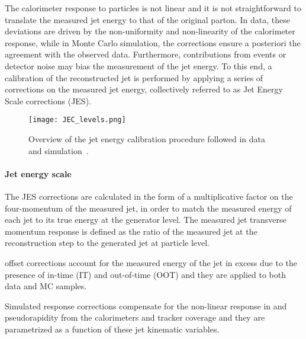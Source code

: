 The calorimeter response to particles is not linear and it is not straightforward to translate the measured jet energy
to that of the original parton.
In data, these deviations are driven by the non-uniformity and non-linearity of the calorimeter response,
while in Monte Carlo simulation, the corrections ensure a posteriori the agreement with the observed data.
Furthermore, contributions from \pileup{} events or detector noise may bias the measurement of the jet energy.
To this end, a calibration of the reconstructed jet is performed by applying a series of corrections on the measured jet energy,
collectively referred to as Jet Energy Scale corrections (JES).

\begin{figure}
\centering
\texttt{[image: JEC\_levels.png]}
\caption{Overview of the jet energy calibration procedure followed in data and simulation~\cite{CMS-JME-13-004}.}
\label{fig:JECoverview}
\end{figure}


\paragraph{Jet energy scale\\}
The JES corrections are calculated in the form of a multiplicative factor on the four-momentum of the measured jet,
in order to match the measured energy of each jet to its true energy at the generator level.
The measured jet transverse momentum response is defined as the ratio of the measured jet \pt at the reconstruction step to the generated jet at particle level.

\Pileup{} offset corrections account for the measured energy of the jet in excess due to
the presence of in-time (IT) and out-of-time (OOT) \pileup{}
and they are applied to both data and MC samples.

Simulated response corrections compensate for the non-linear response in \pt and pseudorapidity
from the calorimeters and tracker coverage and they are parametrized as a function of these jet kinematic variables.

